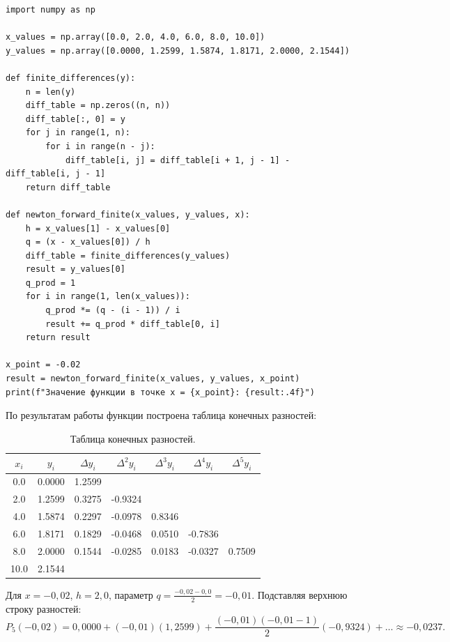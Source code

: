 \documentclass[a4paper, final]{article}
\begin{document}
\begin{lstlisting}[caption={Вычисление значения функции с помощью первого многочлена Ньютона с конечными разностями}, label=lst:newton_fin1]
import numpy as np

x_values = np.array([0.0, 2.0, 4.0, 6.0, 8.0, 10.0])
y_values = np.array([0.0000, 1.2599, 1.5874, 1.8171, 2.0000, 2.1544])

def finite_differences(y):
    n = len(y)
    diff_table = np.zeros((n, n))
    diff_table[:, 0] = y
    for j in range(1, n):
        for i in range(n - j):
            diff_table[i, j] = diff_table[i + 1, j - 1] - diff_table[i, j - 1]
    return diff_table

def newton_forward_finite(x_values, y_values, x):
    h = x_values[1] - x_values[0]
    q = (x - x_values[0]) / h
    diff_table = finite_differences(y_values)
    result = y_values[0]
    q_prod = 1
    for i in range(1, len(x_values)):
        q_prod *= (q - (i - 1)) / i
        result += q_prod * diff_table[0, i]
    return result

x_point = -0.02
result = newton_forward_finite(x_values, y_values, x_point)
print(f"Значение функции в точке x = {x_point}: {result:.4f}")
\end{lstlisting}

По результатам работы функции построена таблица конечных разностей:

\begin{table}[h!]
\centering
\begin{tabular}{|c|c|c|c|c|c|c|}
\hline
$x_i$ & $y_i$ & $\Delta y_i$ & $\Delta^2 y_i$ & $\Delta^3 y_i$ & $\Delta^4 y_i$ & $\Delta^5 y_i$ \\
\hline
0.0 & 0.0000 & 1.2599 & & & & \\
2.0 & 1.2599 & 0.3275 & -0.9324 & & & \\
4.0 & 1.5874 & 0.2297 & -0.0978 & 0.8346 & & \\
6.0 & 1.8171 & 0.1829 & -0.0468 & 0.0510 & -0.7836 & \\
8.0 & 2.0000 & 0.1544 & -0.0285 & 0.0183 & -0.0327 & 0.7509 \\
10.0 & 2.1544 & & & & & \\
\hline
\end{tabular}
\caption{Таблица конечных разностей.}
\label{tab:fin_diff}
\end{table}

Для $x = -0{,}02$, $h = 2{,}0$, параметр $q = \frac{-0{,}02 - 0{,}0}{2} = -0{,}01$. Подставляя верхнюю строку разностей:
\[
P_5(-0{,}02) = 0{,}0000 + (-0{,}01)(1{,}2599) + \frac{(-0{,}01)(-0{,}01 - 1)}{2} (-0{,}9324) + \dots \approx -0{,}0237.
\]
\end{document}
